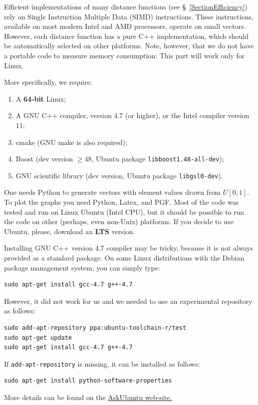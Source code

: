 \documentclass[runningheads,a4paper]{llncs}
\newcommand{\ttt}[1]{\texttt{#1}}
\begin{document}
{Efficient implementations of many distance functions (see \S~\ref{SectionEfficiency})
rely on Single Instruction Multiple Data (SIMD) instructions. 
These instructions, available on most modern Intel and AMD processors, 
operate on small vectors. 
However, each distance function has a pure C++ implementation,
which should be automatically selected on other platforms.
Note, however, that we do not have a portable code to measure memory consumption:
This part will work only for Linux. 

More specifically, we require:
\begin{enumerate}
\item A \textbf{64-bit} Linux;
\item A GNU C++ compiler, version 4.7 (or higher), or the Intel compiler version 11;
\item cmake (GNU make is also required);
\item Boost (dev version $\ge48$, Ubuntu package \ttt{libboost1.48-all-dev});
\item GNU scientific library (dev version, Ubuntu package \ttt{libgsl0-dev}).
\end{enumerate}
One needs Python to generate vectors with element values drawn from $U[0,1]$.
To plot the graphs you need Python, Latex, and PGF. 
Most of the code was tested and run on Linux Ubuntu (Intel CPU), 
but it should be possible to run the code on other (perhaps, even non-Unix) platforms.
If you decide to use Ubuntu, please, download an \textbf{LTS} version.

Installing GNU C++ version 4.7 compiler may be tricky, because it is not always provided as a standard package.
On some Linux distributions with the Debian package management system, you can simply type:
\begin{verbatim}
sudo apt-get install gcc-4.7 g++-4.7
\end{verbatim}
However, it did not work for us and we needed to use an experimental repository as follows:
\begin{verbatim}
sudo add-apt-repository ppa:ubuntu-toolchain-r/test
sudo apt-get update
sudo apt-get install gcc-4.7 g++-4.7
\end{verbatim}
If \ttt{add-apt-repository} is missing, it can be installed as follows:
\begin{verbatim}
sudo apt-get install python-software-properties
\end{verbatim}
More details can be found on the \href{http://askubuntu.com/questions/113291/how-do-i-install-gcc-4-7}{AskUbuntu web-site.}

}
\end{document}
